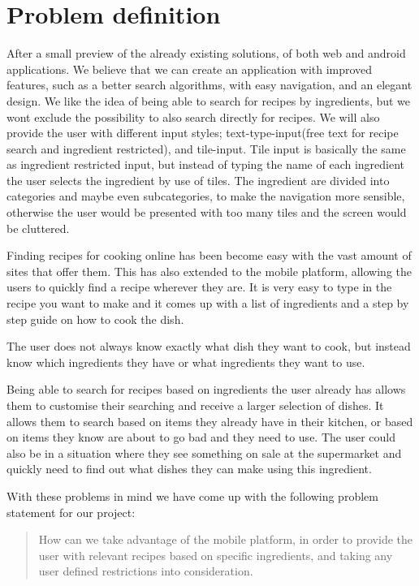 \section{Problem definition}\label{sec:probdef}

After a small preview of the already existing solutions, of both web and android applications. We believe that we can create an application with improved features, such as a better search algorithms, with easy navigation, and an elegant design. We like the idea of being able to search for recipes by ingredients, but we wont exclude the possibility to also search directly for recipes. We will also provide the user with different input styles; text-type-input(free text for recipe search and ingredient restricted), and tile-input. Tile input is basically the same as ingredient restricted input, but instead of typing the name of each ingredient the user selects the ingredient by use of tiles. The ingredient are divided into categories and maybe even subcategories, to make the navigation more sensible, otherwise the user would be presented with too many tiles and the screen would be cluttered.

Finding recipes for cooking online has been become easy with the vast amount of sites that offer them. This has also extended to the mobile platform, allowing the users to quickly find a recipe wherever they are. It is very easy to type in the recipe you want to make and it comes up with a list of ingredients and a step by step guide on how to cook the dish.

The user does not always know exactly what dish they want to cook, but instead know which ingredients they have or what ingredients they want to use.

Being able to search for recipes based on ingredients the user already has allows them to customise their searching and receive a larger selection of dishes. It allows them to search based on items they already have in their kitchen, or based on items they know are about to go bad and they need to use. The user could also be in a situation where they see something on sale at the supermarket and quickly need to find out what dishes they can make using this ingredient.

With these problems in mind we have come up with the following problem statement for our project:

\begin{quote}
How can we take advantage of the mobile platform, in order to provide the user with relevant recipes based on specific ingredients, and taking any user defined restrictions into consideration.
\end{quote}
